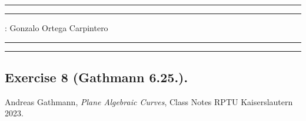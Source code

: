 \documentclass[11pt,a4paper]{article}
\begin{document}
\hrule\hrule
\vspace{1mm}


\vspace{1mm}

 : Gonzalo Ortega Carpintero
\vspace{2mm}

\hrule\hrule

\subsection*{Exercise 8 (Gathmann 6.25.).}




\begin{thebibliography}{9}

  Andreas Gathmann,
  \textit{Plane Algebraic Curves},
  Class Notes RPTU Kaiserslautern 2023.
  
\end{thebibliography}
\end{document}
